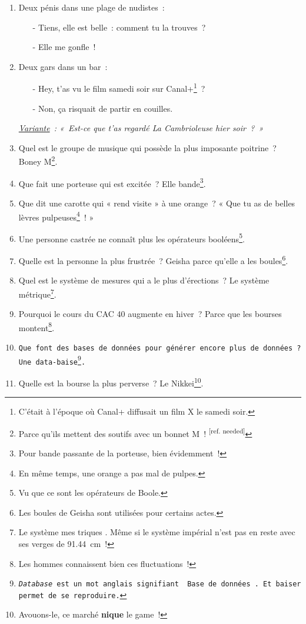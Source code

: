 \documentclass[10pt,a5paper,fullpage]{book}
\begin{document}
\begin{enumerate}
		\item Deux pénis dans une plage de nudistes~: 
		\begin{itemize}
			\item[-] Tiens, elle est belle~: comment tu la trouves~?
			\item[-] Elle me gonfle~!~
		\end{itemize}
		\item Deux gars dans un bar~:
		\begin{itemize}
			\item[-] Hey, t’as vu le film samedi soir sur Canal+\footnote{C'était à l'époque où Canal+ diffusait un film X le samedi soir.}~?
			\item[-] Non, ça risquait de partir en couilles. 
		\end{itemize}
		\textit{\underline{Variante}~: «~Est-ce que t’as regardé La Cambrioleuse hier soir~?~»}
		\item Quel est le groupe de musique qui possède la plus imposante poitrine~? Boney M\footnote{Parce qu'ils mettent des soutifs avec un bonnet M~! \textsuperscript{[ref. needed]} }.
		\item Que fait une porteuse qui est excitée~? Elle bande\footnote{Pour bande passante de la porteuse, bien évidemment~!}.
		\item Que dit une carotte qui « rend visite » à une orange~? « Que tu as de belles lèvres pulpeuses\footnote{En même temps, une orange a pas mal de pulpes.}~! »
		\item Une personne castrée ne connaît plus les opérateurs booléens\footnote{Vu que ce sont les opérateurs de Boole.}.
		\item Quelle est la personne la plus frustrée~? Geisha parce qu’elle a les boules\footnote{Les boules de Geisha sont utilisées pour certains actes.}.
		\item Quel est le système de mesures qui a le plus d’érections~? Le système métrique\footnote{Le système \guillemotleft mes triques \guillemotright. Même si le système impérial n'est pas en reste avec ses verges de 91.44~cm~!}.
		\item Pourquoi le cours du CAC 40 augmente en hiver~? Parce que les bourses montent\footnote{Les hommes connaissent bien ces fluctuations~!}. 
		\item \texttt{Que font des bases de données pour générer encore plus de données~? Une data-baise\footnote{\textit{Database} est un mot anglais signifiant \guillemotleft~Base de données~\guillemotright. Et baiser permet de se reproduire. }.}
		\item Quelle est la bourse la plus perverse~? Le Nikkei\footnote{Avouons-le, ce marché \textbf{nique} le game~!}.

\end{enumerate}
\end{document}
